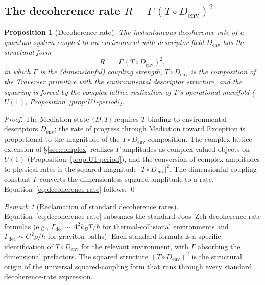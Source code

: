 \documentclass[11pt,a4paper]{article}
\newtheorem{proposition}[theorem]{Proposition}
\theoremstyle{definition}
\theoremstyle{remark}
\newtheorem{remark}[theorem]{Remark}
\begin{document}
\subsection{The decoherence rate \texorpdfstring{$R = \Gamma\,(T \circ D_{\mathrm{env}})^{2}$}{R = Gamma (T comp Denv)^2}}\label{subsec:decoherence-rate}

\begin{proposition}[Decoherence rate]\label{prop:decoherence-rate}
The instantaneous decoherence rate of a quantum system coupled to an environment with descriptor field $D_{\mathrm{env}}$ has the structural form
\begin{equation}\label{eq:decoherence-rate}
R \;=\; \Gamma\,(T \circ D_{\mathrm{env}})^{2},
\end{equation}
in which $\Gamma$ is the (dimensionful) coupling strength, $T \circ D_{\mathrm{env}}$ is the composition of the Traverser primitive with the environmental descriptor structure, and the squaring is forced by the complex-lattice realization of $T$'s operational manifold ($U(1)$, Proposition~\ref{prop:U1-period}).
\end{proposition}

\begin{proof}
The Mediation state $\{D,T\}$ requires $T$-binding to environmental descriptors $D_{\mathrm{env}}$; the rate of progress through Mediation toward Exception is proportional to the magnitude of the $T \circ D_{\mathrm{env}}$ composition. The complex-lattice extension of \S\ref{sec:complex} realizes $T$-amplitudes as complex-valued objects on $U(1)$ (Proposition~\ref{prop:U1-period}), and the conversion of complex amplitudes to physical rates is the squared-magnitude $|T \circ D_{\mathrm{env}}|^{2}$. The dimensionful coupling constant $\Gamma$ converts the dimensionless squared amplitude to a rate. Equation~\eqref{eq:decoherence-rate} follows. \qed
\end{proof}

\begin{remark}[Reclamation of standard decoherence rates]\label{rem:decoherence-rate-reclaim}
Equation~\eqref{eq:decoherence-rate} subsumes the standard Joos--Zeh decoherence rate formulas (e.g., $\Gamma_{\mathrm{dec}} \sim \Lambda^{2} k_{B} T/\hbar$ for thermal-collisional environments and $\Gamma_{\mathrm{dec}} \sim G^{2}\rho/\hbar$ for graviton baths). Each standard formula is a specific identification of $T \circ D_{\mathrm{env}}$ for the relevant environment, with $\Gamma$ absorbing the dimensional prefactors. The squared structure $(T \circ D_{\mathrm{env}})^{2}$ is the structural origin of the universal squared-coupling form that runs through every standard decoherence-rate expression.
\end{remark}
\end{document}
